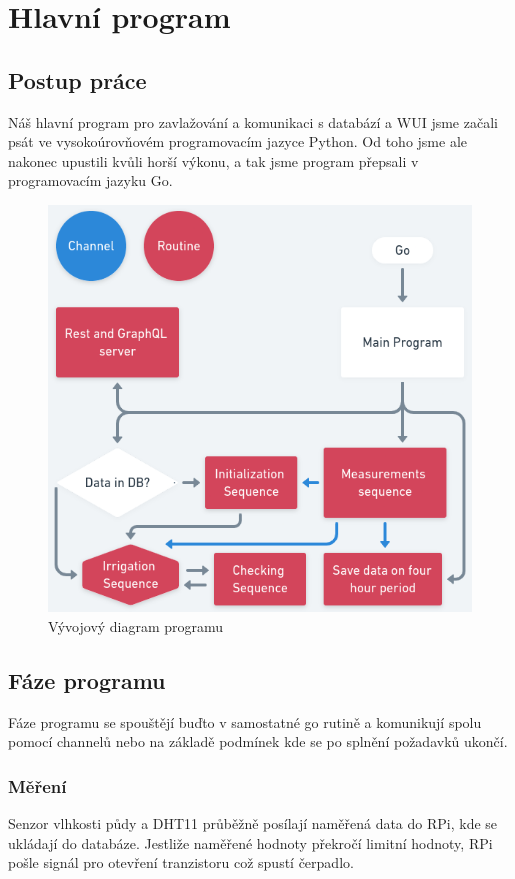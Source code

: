 \documentclass[12pt,a4paper]{article}
\begin{document}
\clearpage

\section{Hlavní program}

\subsection{Postup práce}

Náš hlavní program pro zavlažování a komunikaci s databází a \ac{WUI}
jsme začali psát ve vysokoúrovňovém programovacím jazyce Python. Od toho jsme
ale nakonec upustili kvůli horší výkonu, a tak jsme program přepsali v
programovacím jazyku Go.

\begin{figure}[h]
	\centering
	\includegraphics[width=0.72\linewidth]{go.png}
	\caption{Vývojový diagram programu}
\end{figure}

\subsection{Fáze programu}

Fáze programu se spouštějí buďto v samostatné go rutině a komunikují spolu
pomocí channelů nebo na základě podmínek kde se po splnění požadavků ukončí.

\subsubsection{Měření}

Senzor vlhkosti půdy a \ac{DHT11} průběžně posílají naměřená data do \ac{RPi},
kde se
ukládají do databáze. Jestliže naměřené hodnoty překročí limitní hodnoty,
\ac{RPi}
pošle signál pro otevření tranzistoru což spustí čerpadlo.
\end{document}
